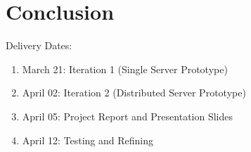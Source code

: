 
\section{Conclusion}
\label{sec:conclusion}

Delivery Dates:
\begin{enumerate}[topsep=2pt,itemsep=-1ex,partopsep=1ex,parsep=1ex]
	\item March 21: Iteration 1 (Single Server Prototype)
	\item April 02:  Iteration 2 (Distributed Server Prototype)
	\item April 05: Project Report and Presentation Slides
	\item April 12: Testing and Refining
\end{enumerate}